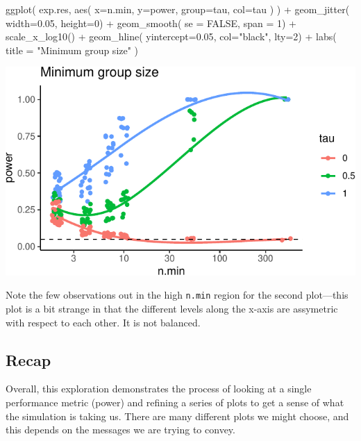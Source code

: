 \documentclass[
]{book}
\newenvironment{Shaded}{\begin{snugshade}}{\end{snugshade}}
\newcommand{\AttributeTok}[1]{\textcolor[rgb]{0.77,0.63,0.00}{#1}}
\newcommand{\ConstantTok}[1]{\textcolor[rgb]{0.00,0.00,0.00}{#1}}
\newcommand{\DecValTok}[1]{\textcolor[rgb]{0.00,0.00,0.81}{#1}}
\newcommand{\FloatTok}[1]{\textcolor[rgb]{0.00,0.00,0.81}{#1}}
\newcommand{\FunctionTok}[1]{\textcolor[rgb]{0.00,0.00,0.00}{#1}}
\newcommand{\NormalTok}[1]{#1}
\newcommand{\SpecialCharTok}[1]{\textcolor[rgb]{0.00,0.00,0.00}{#1}}
\newcommand{\StringTok}[1]{\textcolor[rgb]{0.31,0.60,0.02}{#1}}
\begin{document}
\begin{Shaded}
\begin{Highlighting}[]
\FunctionTok{ggplot}\NormalTok{( exp.res, }\FunctionTok{aes}\NormalTok{( }\AttributeTok{x=}\NormalTok{n.min, }\AttributeTok{y=}\NormalTok{power, }\AttributeTok{group=}\NormalTok{tau, }\AttributeTok{col=}\NormalTok{tau ) ) }\SpecialCharTok{+}
  \FunctionTok{geom\_jitter}\NormalTok{( }\AttributeTok{width=}\FloatTok{0.05}\NormalTok{, }\AttributeTok{height=}\DecValTok{0}\NormalTok{) }\SpecialCharTok{+}
  \FunctionTok{geom\_smooth}\NormalTok{( }\AttributeTok{se =} \ConstantTok{FALSE}\NormalTok{, }\AttributeTok{span =} \DecValTok{1}\NormalTok{) }\SpecialCharTok{+}
  \FunctionTok{scale\_x\_log10}\NormalTok{() }\SpecialCharTok{+}
  \FunctionTok{geom\_hline}\NormalTok{( }\AttributeTok{yintercept=}\FloatTok{0.05}\NormalTok{, }\AttributeTok{col=}\StringTok{"black"}\NormalTok{, }\AttributeTok{lty=}\DecValTok{2}\NormalTok{) }\SpecialCharTok{+}
  \FunctionTok{labs}\NormalTok{( }\AttributeTok{title =} \StringTok{"Minimum group size"}\NormalTok{ )}
\end{Highlighting}
\end{Shaded}

\begin{center}\includegraphics[width=0.75\linewidth]{Designing-Simulations-in-R_files/figure-latex/plotB-1} \end{center}

Note the few observations out in the high \texttt{n.min} region for the second
plot---this plot is a bit strange in that the different levels along the
x-axis are assymetric with respect to each other. It is not balanced.

\hypertarget{recap}{%
\subsection{Recap}\label{recap}}

Overall, this exploration demonstrates the process of looking at a single performance metric (power) and refining a series of plots to get a sense of what the simulation is taking us.
There are many different plots we might choose, and this depends on the messages we are trying to convey.
\end{document}
